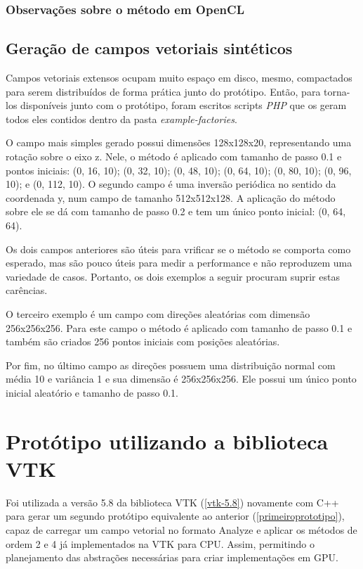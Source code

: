     \subsubsection{Observações sobre o método em OpenCL}
    
  \subsection{Geração de campos vetoriais sintéticos}
  Campos vetoriais extensos ocupam muito espaço em disco, mesmo, compactados para serem distribuídos de forma prática junto do protótipo. Então, para torna-los disponíveis junto com o protótipo, foram escritos scripts \textit{PHP} que os geram todos eles contidos dentro da pasta \textit{example-factories}.
  
  O campo mais simples gerado possui dimensões 128x128x20, representando uma rotação sobre o eixo z. Nele, o método é aplicado com tamanho de passo 0.1 e pontos iniciais: (0, 16, 10); (0, 32, 10); (0, 48, 10); (0, 64, 10); (0, 80, 10); (0, 96, 10); e  (0, 112, 10). O segundo campo é uma inversão periódica no sentido da coordenada y, num campo de tamanho 512x512x128. A aplicação do método sobre ele se dá com tamanho de passo 0.2 e tem um único ponto inicial: (0, 64, 64).
  
  Os dois campos anteriores são úteis para vrificar se o método se comporta como esperado, mas são pouco úteis para medir a performance e não reproduzem uma variedade de casos. Portanto, os dois exemplos a seguir procuram suprir estas carências.
  
  O terceiro exemplo é um campo com direções aleatórias com dimensão 256x256x256. Para este campo o método é aplicado com tamanho de passo 0.1 e também são criados 256 pontos iniciais com posições aleatórias.
  
  Por fim, no último campo as direções possuem uma distribuição normal com média 10 e variância 1 e sua dimensão é 256x256x256. Ele possui um único ponto inicial aleatório e tamanho de passo 0.1.

\section{Protótipo utilizando a biblioteca VTK}
  Foi utilizada a versão 5.8 da biblioteca VTK (\ref{vtk-5.8}) novamente com C++ para gerar um segundo protótipo equivalente ao anterior (\ref{primeiroprototipo}), capaz de carregar um campo vetorial no formato Analyze e aplicar os métodos de ordem 2 e 4 já implementados na VTK para CPU. Assim, permitindo o planejamento das abstrações necessárias para criar implementações em GPU.
  
